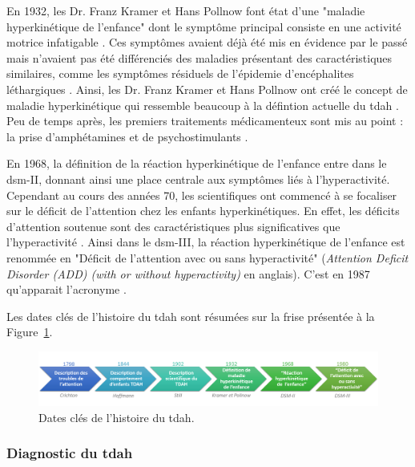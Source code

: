 En 1932, les Dr. Franz Kramer et Hans Pollnow font état d'une "maladie hyperkinétique de l'enfance" dont le symptôme principal consiste en une 
activité motrice infatigable \citep{Kramer1932}. Ces symptômes avaient déjà été mis en évidence par le passé mais n'avaient pas été différenciés 
des maladies présentant des caractéristiques similaires, comme les symptômes résiduels de l'épidemie d'encéphalites léthargiques \citep{Lange2010}. 
Ainsi, les Dr. Franz Kramer et Hans Pollnow ont créé le concept de maladie hyperkinétique qui ressemble beaucoup à la défintion actuelle
du \gls{tdah} \citep{Lange2010}. Peu de temps après, les premiers traitements médicamenteux sont mis au point : la prise d'amphétamines 
\citep{Bradley1937} et de psychostimulants \citep{Morton2000}. 

En 1968, la définition de la réaction hyperkinétique de l'enfance entre dans le \gls{dsm}-II, donnant ainsi une place centrale aux symptômes liés 
à l'hyperactivité. Cependant au cours des années 70, les scientifiques ont commencé à se focaliser sur le déficit de l'attention chez les enfants
hyperkinétiques. En effet, les déficits d'attention soutenue sont des caractéristiques plus significatives que l'hyperactivité 
\citep{Barkley2006, Douglas1972}. Ainsi dans le \gls{dsm}-III, la réaction hyperkinétique de l'enfance est renommée en "Déficit de l'attention 
avec ou sans hyperactivité" (\textit{Attention Deficit Disorder (ADD) (with or without hyperactivity)} en anglais). C'est en 1987 qu'apparait
l'acronyme  \citep{Lange2010}. 

Les dates clés de l'histoire du \gls{tdah} sont résumées sur la frise présentée à la Figure~\ref{Figure:introduction_adhd_history}.

\begin{figure}[h!]
  \centering
	\includegraphics[width=1\linewidth]{figures/chapter-1/introduction-adhd-history} 
  \caption{Dates clés de l'histoire du \gls{tdah}.}
  \label{Figure:introduction_adhd_history}
\end{figure}

\subsubsection{Diagnostic du \gls{tdah}}

